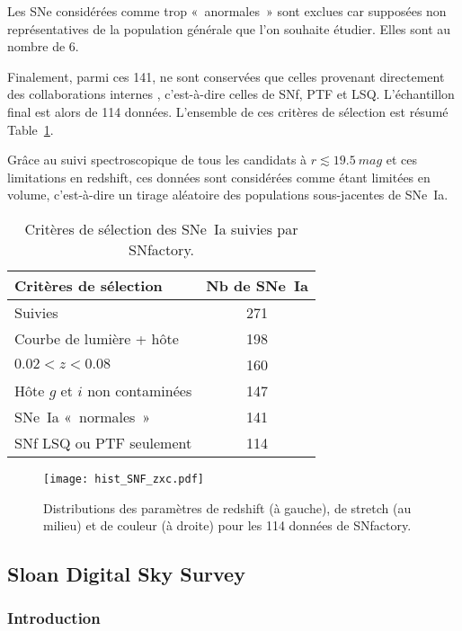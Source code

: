 \documentclass[../main/main.tex]{subfiles}
\begin{document}
Les SNe considérées comme trop «~anormales~» sont exclues car supposées non
représentatives de la population générale que l'on souhaite étudier. Elles sont
au nombre de 6.

Finalement, parmi ces 141, ne sont conservées que celles provenant directement
des collaborations internes , c'est-à-dire
celles de SNf, PTF et LSQ. L'échantillon final est alors de 114 données.  
L'ensemble de ces critères de sélection est résumé Table~\ref{tab:snfcuts}.

Grâce au suivi spectroscopique de tous les candidats à $r \lesssim
\SI{19.5}{mag}$ et ces limitations en redshift, ces données sont considérées
comme étant limitées en volume, c'est-à-dire un tirage aléatoire des populations
sous-jacentes de SNe~Ia.

\begin{table}[]
    \centering
    \caption{Critères de sélection des SNe~Ia suivies par SNfactory.}
    \label{tab:snfcuts}
    \begin{tabular}{lc}
        \toprule
        Critères de sélection           & Nb de SNe~Ia \\
        \midrule
        Suivies                         & 271 \\
        Courbe de lumière + hôte        & 198 \\
        $0.02 < z < 0.08$               & 160 \\
        Hôte $g$ et $i$ non contaminées & 147 \\
        SNe~Ia «~normales~»             & 141 \\
        SNf LSQ ou PTF seulement        & 114 \\
        \bottomrule
    \end{tabular}
\end{table}

\begin{figure}[h]
    \centering
    \texttt{[image: hist\_SNF\_zxc.pdf]}
    \captionsetup{justification=centering}
    \caption{Distributions des paramètres de redshift (à gauche), de stretch (au
    milieu) et de couleur (à droite) pour les 114 données de SNfactory.}
    \label{fig:snfhist}
\end{figure}

\subsection{Sloan Digital Sky Survey}\label{ssec:sdss}
\subsubsection{Introduction}\label{sssec:sdssintro}
\end{document}
